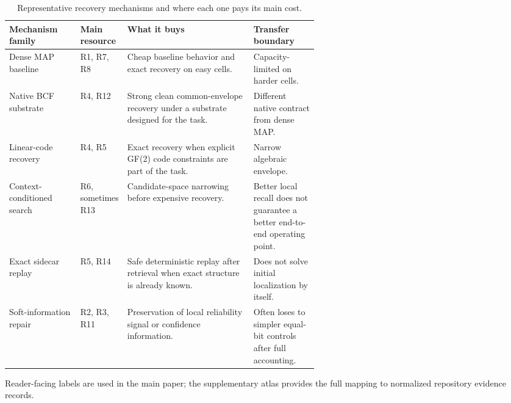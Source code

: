 \begin{table}[htbp]
\centering
\footnotesize
\begin{threeparttable}
\caption{Representative recovery mechanisms and where each one pays its main cost.}
\label{tab:mechanism-summary}
\begin{tabularx}{\linewidth}{@{}p{0.23\linewidth}p{0.15\linewidth}X p{0.21\linewidth}@{}}
\toprule
\textbf{Mechanism family} & \textbf{Main resource} & \textbf{What it buys} & \textbf{Transfer boundary} \\
\midrule
Dense MAP baseline & R1, R7, R8 & Cheap baseline behavior and exact recovery on easy cells. & Capacity-limited on harder cells. \\
Native BCF substrate & R4, R12 & Strong clean common-envelope recovery under a substrate designed for the task. & Different native contract from dense MAP. \\
Linear-code recovery & R4, R5 & Exact recovery when explicit GF(2) code constraints are part of the task. & Narrow algebraic envelope. \\
Context-conditioned search & R6, sometimes R13 & Candidate-space narrowing before expensive recovery. & Better local recall does not guarantee a better end-to-end operating point. \\
Exact sidecar replay & R5, R14 & Safe deterministic replay after retrieval when exact structure is already known. & Does not solve initial localization by itself. \\
Soft-information repair & R2, R3, R11 & Preservation of local reliability signal or confidence information. & Often loses to simpler equal-bit controls after full accounting. \\
\bottomrule
\end{tabularx}
\begin{tablenotes}[flushleft]
\footnotesize
\item Reader-facing labels are used in the main paper; the supplementary atlas provides the full mapping to normalized repository evidence records.
\end{tablenotes}
\end{threeparttable}
\end{table}
